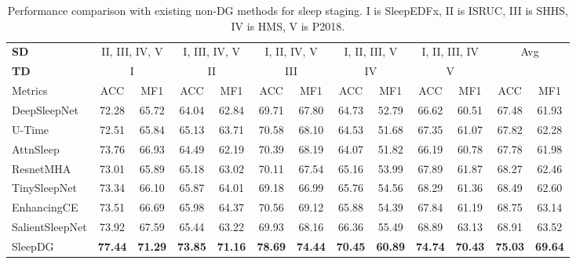 \documentclass[letterpaper]{article} %
\begin{document}
	\begin{table}[tb]
		\centering
		\small
		\begin{tabular}{lcccccccccccc} 
			\toprule
			\textbf{SD}& \multicolumn{2}{c}{II, III, IV, V} & \multicolumn{2}{c}{I, III, IV, V} & \multicolumn{2}{c}{I, II, IV, V} & \multicolumn{2}{c}{I, II, III, V} & \multicolumn{2}{c}{I, II, III, IV}& \multicolumn{2}{c}{\multirow{2}{*}{Avg}}\\
			\cmidrule(lr){1-1}\cmidrule(lr){2-3}\cmidrule(lr){4-5}\cmidrule(lr){6-7}\cmidrule(lr){8-9}\cmidrule(lr){10-11}
			\textbf{TD}&\multicolumn{2}{c}{I} & \multicolumn{2}{c}{II} & \multicolumn{2}{c}{III} & \multicolumn{2}{c}{IV} & \multicolumn{2}{c}{V}&&\\
			\cmidrule(lr){1-1}\cmidrule(lr){2-3}\cmidrule(lr){4-5}\cmidrule(lr){6-7}\cmidrule(lr){8-9}\cmidrule(lr){10-11}\cmidrule(lr){12-13}
			Metrics& ACC & MF1 & ACC & MF1 & ACC & MF1 & ACC & MF1 & ACC & MF1 & ACC & MF1 \\
			\midrule
			DeepSleepNet&72.28&65.72&64.04&62.84&69.71&67.80&64.73&52.79&66.62&60.51&67.48&61.93\\
			U-Time&72.51&65.84&65.13&63.71&70.58&68.10&64.53&51.68&67.35&61.07&67.82&62.28\\
			AttnSleep&73.76&66.93&64.49&62.19&70.39&68.19&64.07&51.82&66.19&60.78&67.78&61.98\\
			ResnetMHA&73.01&65.89&65.18&63.02&70.11&67.54&65.16&53.99&67.89&61.87&68.27&62.46\\
			TinySleepNet&73.34&66.10&65.87&64.01&69.18&66.99&65.76&54.56&68.29&61.36&68.49&62.60\\
			EnhancingCE&73.51&66.69&65.98&64.37&70.56&69.12&65.88&54.39&67.84&61.19&68.75&63.14\\
			SalientSleepNet&73.92&67.59&65.44&63.22&69.93&68.16&66.36&55.49&68.89&63.13&68.91&63.52\\
			\midrule
			SleepDG&\textbf{77.44}&\textbf{71.29}&\textbf{73.85}&\textbf{71.16}&\textbf{78.69}&\textbf{74.44}&\textbf{70.45}&\textbf{60.89}&\textbf{74.74}&\textbf{70.43}&\textbf{75.03}&\textbf{69.64}\\
			\bottomrule
		\end{tabular}
		\caption{Performance comparison with existing non-DG methods for sleep staging. I is SleepEDFx, II is ISRUC, III is SHHS, IV is HMS, V is P2018.}\label{tab:CompSS}
	\end{table}
	
\end{document}
